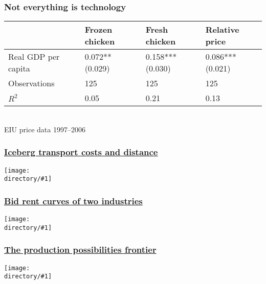 \documentclass[compress,mathserif]{beamer}
\newcounter{perc}
\newcounter{percek}
\newcommand{\directory}{figures}
\newcommand{\widefigure}[2]{\begin{frame}\frametitle{\hyperlink{#1back}{#2}}\hypertarget{#1}{{\begin{center}\label{#1}\texttt{[image: \\directory/\#1]}\end{center}}}\end{frame}}
\renewcommand{\time}[1]{\addtocounter{percek}{#1}}
\begin{document}
\time{2}

\begin{frame}\frametitle{Not everything is technology}
\label{chicken}
\begin{center}
\begin{tabular}{lm{5em}m{5em}m{5em}}
  \hline
   & Frozen chicken & Fresh chicken & Relative price\\
   \hline
  Real GDP per capita & 0.072**   (0.029) & 0.158***   (0.030) & 0.086***   (0.021)\\
\hline
  Observations &  125 & 125 & 125
\\
  $R^2$ &  0.05& 0.21 & 0.13
\\
  \hline
\end{tabular}\\
{\small EIU price data 1997--2006}
\end{center}
\end{frame}

\time 2

\widefigure{Dz-exp}{Iceberg transport costs and distance}

\widefigure{bid-rent-2-exp}{Bid rent curves of two industries}
\time{3}

\widefigure{PPF-location}{The production possibilities frontier}


\end{document}
